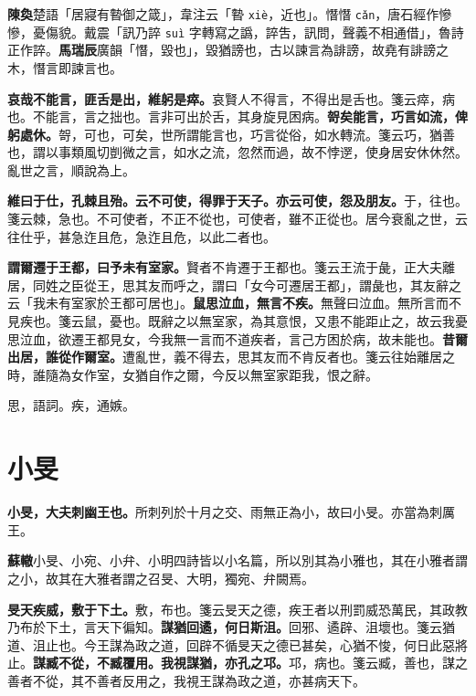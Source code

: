\begin{quoting}\textbf{陳奐}楚語「居寢有暬御之箴」，韋注云「暬 \texttt{xiè}，近也」。憯憯 \texttt{cǎn}，唐石經作慘慘，憂傷貌。戴震「訊乃誶 \texttt{suì} 字轉寫之譌，誶吿，訊問，聲義不相通借」，魯詩正作誶。\textbf{馬瑞辰}廣韻「憯，毀也」，毀猶謗也，古以諫言為誹謗，故堯有誹謗之木，憯言即諫言也。\end{quoting}

\textbf{哀哉不能言，匪舌是出，維躬是瘁。}{\footnotesize 哀賢人不得言，不得出是舌也。箋云瘁，病也。不能言，言之拙也。言非可出於舌，其身旋見困病。}\textbf{哿矣能言，巧言如流，俾躬處休。}{\footnotesize 哿，可也，可矣，世所謂能言也，巧言從俗，如水轉流。箋云巧，猶善也，謂以事類風切剴微之言，如水之流，忽然而過，故不悖遻，使身居安休休然。亂世之言，順說為上。}

\textbf{維曰于仕，孔棘且殆。云不可使，得罪于天子。亦云可使，怨及朋友。}{\footnotesize 于，往也。箋云棘，急也。不可使者，不正不從也，可使者，雖不正從也。居今衰亂之世，云往仕乎，甚急迮且危，急迮且危，以此二者也。}

\textbf{謂爾遷于王都，曰予未有室家。}{\footnotesize 賢者不肯遷于王都也。箋云王流于彘，正大夫離居，同姓之臣從王，思其友而呼之，謂曰「女今可遷居王都」，謂彘也，其友辭之云「我未有室家於王都可居也」。}\textbf{鼠思泣血，無言不疾。}{\footnotesize 無聲曰泣血。無所言而不見疾也。箋云鼠，憂也。既辭之以無室家，為其意恨，又患不能距止之，故云我憂思泣血，欲遷王都見女，今我無一言而不道疾者，言己方困於病，故未能也。}\textbf{昔爾出居，誰從作爾室。}{\footnotesize 遭亂世，義不得去，思其友而不肯反者也。箋云往始離居之時，誰隨為女作室，女猶自作之爾，今反以無室家距我，恨之辭。}

\begin{quoting}思，語詞。疾，通嫉。\end{quoting}

\section{小旻}


\textbf{小旻，大夫刺幽王也。}{\footnotesize 所刺列於十月之交、雨無正為小，故曰小旻。亦當為刺厲王。}

\begin{quoting}\textbf{蘇轍}小旻、小宛、小弁、小明四詩皆以小名篇，所以別其為小雅也，其在小雅者謂之小，故其在大雅者謂之召旻、大明，獨宛、弁闕焉。\end{quoting}

\textbf{旻天疾威，敷于下土。}{\footnotesize 敷，布也。箋云旻天之德，疾王者以刑罰威恐萬民，其政教乃布於下土，言天下徧知。}\textbf{謀猶回遹，何日斯沮。}{\footnotesize 回邪、遹辟、沮壞也。箋云猶道、沮止也。今王謀為政之道，回辟不循旻天之德已甚矣，心猶不悛，何日此惡將止。}\textbf{謀臧不從，不臧覆用。我視謀猶，亦孔之邛。}{\footnotesize 邛，病也。箋云臧，善也，謀之善者不從，其不善者反用之，我視王謀為政之道，亦甚病天下。}

